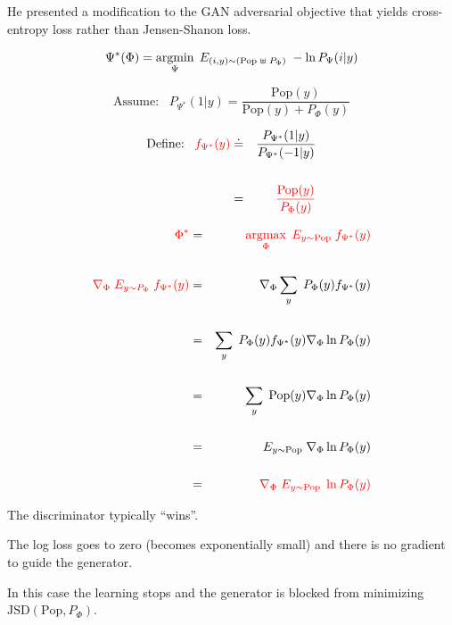 {\vfill
He presented a modification to the GAN adversarial objective that yields cross-entropy loss rather than Jensen-Shanon loss.


{\color{red} $$\Psi^*(\Phi) = \operatorname*{argmin}_\Psi \;E_{(i,y) \sim (\mathrm{Pop}\; \uplus \;P_\Phi)}\;- \ln P_\Psi(i|y)$$}

\vfill
$$\mbox{Assume:}\;\;\; P_{\Psi^*}(1|y) = \frac{\mathrm{Pop}(y)}{\mathrm{Pop}(y) + P_\Phi(y)}$$

\vfill
\begin{eqnarray*}
  \mbox{Define:}\;\;\; {\color{red} f_{\Psi^*}(y)} & \doteq & \frac{P_{\Psi^*}(1|y)}{P_{\Psi^*}(-1|y)} \\
\\
& = & {\color{red} \frac{\mathrm{Pop}(y)}{P_\Phi(y)}}
\end{eqnarray*}


{\huge
\begin{eqnarray*}
 {\color{red} \Phi^*}& = & {\color{red} \operatorname*{argmax}_\Phi\;E_{y \sim \mathrm{Pop}} \;f_{\Psi^*}(y)} \\
 \\
 {\color{red} \nabla_\Phi \; E_{y \sim P_\Phi}\;  f_{\Psi^*}(y)}  & = & \nabla _\Phi \sum_y\; P_\Phi(y) f_{\Psi^*}(y) \\
  \\
  & = & \sum_y \; P_\Phi(y) f_{\Psi^*}(y) \nabla_\Phi \ln P_\Phi(y) \\
  \\
  & = & \sum_y \;\mathrm{Pop}(y) \nabla_\Phi \ln P_\Phi(y) \\
  \\
  & = & E_{y \sim \mathrm{Pop}} \; \nabla_\Phi \ln P_\Phi(y) \\
  \\
  & = & {\color{red} \nabla_\Phi \; E_{y \sim \mathrm{Pop}} \;\ln P_\Phi(y)}
\end{eqnarray*}
}


The discriminator typically ``wins''.

\vfill
The log loss goes to zero (becomes exponentially small) and there is no gradient to guide the generator.

\vfill
In this case the learning stops and the generator is blocked from minimizing $\mathrm{JSD}(\mathrm{Pop},P_\Phi)$.


}
